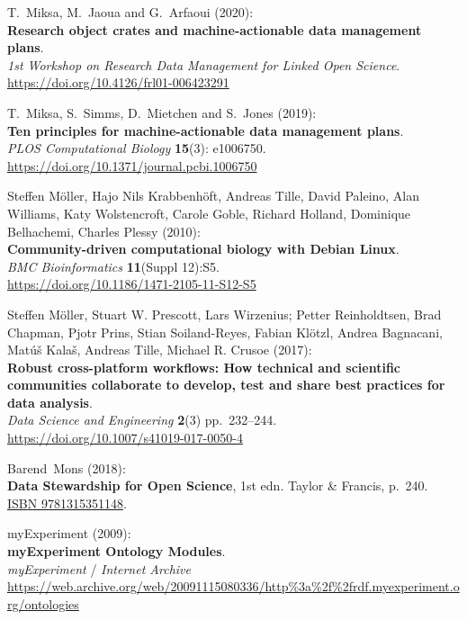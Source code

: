 \begin{thebibliography}{9}
T.~Miksa, M.~Jaoua and G.~Arfaoui (2020):\\
\textbf{Research object crates and machine-actionable data management
plans}.\\
\emph{1st Workshop on Research Data Management for Linked Open
Science}.\\
\url{https://doi.org/10.4126/frl01-006423291}

T.~Miksa, S.~Simms, D.~Mietchen and S.~Jones (2019):\\
\textbf{Ten principles for machine-actionable data management plans}.\\
\emph{PLOS Computational Biology} \textbf{15}(3): e1006750.\\
\url{https://doi.org/10.1371/journal.pcbi.1006750}

Steffen Möller, Hajo Nils Krabbenhöft, Andreas Tille, David
Paleino, Alan Williams, Katy Wolstencroft, Carole Goble, Richard
Holland, Dominique Belhachemi, Charles Plessy (2010):\\
\textbf{Community-driven computational biology with Debian Linux}.\\
\emph{BMC Bioinformatics} \textbf{11}(Suppl 12):S5.\\
\url{https://doi.org/10.1186/1471-2105-11-S12-S5}

Steffen Möller, Stuart W. Prescott, Lars Wirzenius; Petter
Reinholdtsen, Brad Chapman, Pjotr Prins, Stian Soiland-Reyes, Fabian
Klötzl, Andrea Bagnacani, Matúš Kalaš, Andreas Tille, Michael R. Crusoe
(2017):\\
\textbf{Robust cross-platform workflows: How technical and scientific
communities collaborate to develop, test and share best practices for
data analysis}.\\
\emph{Data Science and Engineering} \textbf{2}(3) pp.~232--244.\\
\url{https://doi.org/10.1007/s41019-017-0050-4}

Barend~Mons (2018):\\
\textbf{Data Stewardship for Open Science}, 1st edn. Taylor \& Francis,
p.~240. \href{https://identifiers.org/isbn/9781315351148}{ISBN
9781315351148}.

myExperiment (2009):\\
\textbf{myExperiment Ontology Modules}.\\
\emph{myExperiment} / \emph{Internet Archive}\\
\url{https://web.archive.org/web/20091115080336/http\%3a\%2f\%2frdf.myexperiment.org/ontologies}


\end{thebibliography}
